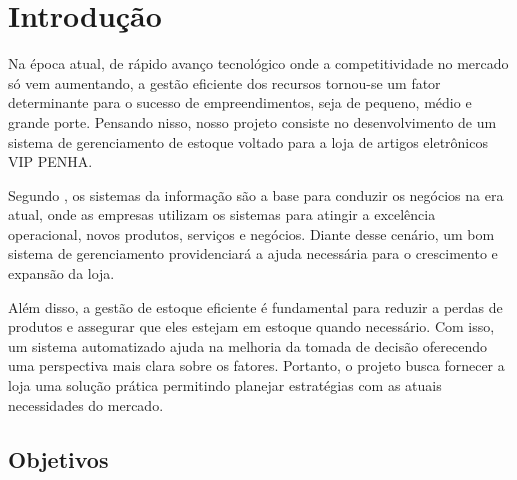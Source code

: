 \documentclass[
	12pt,				%
	openany,			%
	twoside,			%
	a4paper,			%
	english,			%
	brazil				%
	]{abntex2}
\let\cleardoublepage\clearpage
\begin{document}
\listoftables*
\cleardoublepage



\tableofcontents*
\cleardoublepage



\textual

\chapter{Introdução}

Na época atual, de rápido avanço tecnológico onde a competitividade no mercado só vem aumentando, a gestão eficiente dos recursos tornou-se um fator determinante para o sucesso de empreendimentos, seja de pequeno, médio e grande porte. Pensando nisso, nosso projeto consiste no desenvolvimento de um sistema de gerenciamento de estoque voltado para a loja de artigos eletrônicos VIP PENHA.

Segundo   , os sistemas da informação são a base para conduzir os negócios na era atual, onde as empresas utilizam os sistemas para atingir a excelência operacional, novos produtos, serviços e negócios. Diante desse cenário, um bom sistema de gerenciamento providenciará a ajuda necessária para o crescimento e expansão da loja.

Além disso, a gestão de estoque eficiente é fundamental para reduzir a perdas de produtos e assegurar que eles estejam em estoque quando necessário. Com isso, um sistema automatizado ajuda na melhoria da tomada de decisão oferecendo uma perspectiva mais clara sobre os fatores. Portanto, o projeto busca fornecer a loja uma solução prática permitindo planejar estratégias com as atuais necessidades do mercado.


\section{Objetivos}
\end{document}
